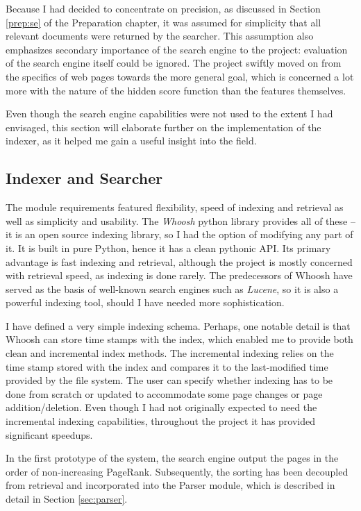 \documentclass[12pt,notitlepage,twoside]{scrbook}
\begin{document}
Because I had decided to concentrate on precision, as discussed in Section \ref{prep:se}
of the Preparation chapter, it was assumed for simplicity that all relevant documents were
returned by the searcher. This assumption also emphasizes secondary importance of the
search engine to the project: evaluation of the search engine itself could be ignored. The
project swiftly moved on from the specifics of web pages towards the more general goal,
which is concerned a lot more with the nature of the hidden score function than the
features themselves.

Even though the search engine capabilities were not used to the extent I had envisaged,
this section will elaborate further on the implementation of the indexer, as it helped me
gain a useful insight into the field.

\subsection{Indexer and Searcher}

The module requirements featured flexibility, speed of indexing and retrieval as well as
simplicity and usability.  The \textit{Whoosh} python library provides all of these -- it
is  an open source indexing library, so I had the option of modifying any part of it.  It
is  built in pure Python, hence it has a clean pythonic API. Its primary advantage is fast
indexing and retrieval, although the project is mostly concerned with retrieval speed, as
indexing is done rarely. The predecessors of Whoosh have served as the basis of well-known
search engines such as \textit{Lucene}, so it is also a powerful indexing tool, should I
have needed more sophistication.

I have defined a very simple indexing schema. Perhaps, one notable detail is that Whoosh
can store time stamps with the index, which enabled me to provide both clean and
incremental index methods. The incremental indexing relies on the time stamp stored with
the index and compares it to the last-modified time provided by the file system. The user
can specify whether indexing has to be done from scratch or updated to accommodate some
page changes or page addition/deletion. Even though I had not originally expected
to need the incremental indexing capabilities, throughout the project it has provided
significant speedups.

In the first prototype of the system, the search engine output the pages in the order of
non-increasing PageRank. Subsequently, the sorting has been decoupled from retrieval and
incorporated into the Parser module, which is described in detail in Section
\ref{sec:parser}.
\end{document}
